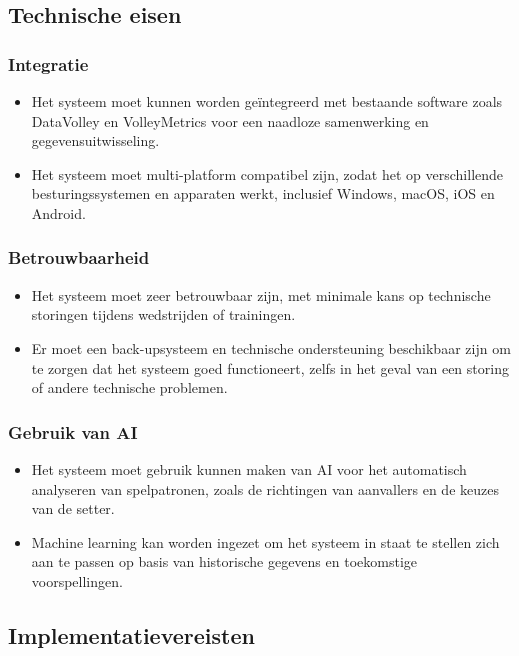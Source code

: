 \subsection{Technische eisen}
\subsubsection{Integratie}
\begin{itemize}
  \item Het systeem moet kunnen worden geïntegreerd met bestaande software zoals DataVolley en VolleyMetrics voor een naadloze samenwerking en gegevensuitwisseling.
  \item Het systeem moet multi-platform compatibel zijn, zodat het op verschillende besturingssystemen en apparaten werkt, inclusief Windows, macOS, iOS en Android.
\end{itemize}

\subsubsection{Betrouwbaarheid}
\begin{itemize}
  \item Het systeem moet zeer betrouwbaar zijn, met minimale kans op technische storingen tijdens wedstrijden of trainingen.
  \item Er moet een back-upsysteem en technische ondersteuning beschikbaar zijn om te zorgen dat het systeem goed functioneert, zelfs in het geval van een storing of andere technische problemen.
\end{itemize}

\subsubsection{Gebruik van AI}
\begin{itemize}
  \item Het systeem moet gebruik kunnen maken van AI voor het automatisch analyseren van spelpatronen, zoals de richtingen van aanvallers en de keuzes van de setter.
  \item Machine learning kan worden ingezet om het systeem in staat te stellen zich aan te passen op basis van historische gegevens en toekomstige voorspellingen.
\end{itemize}

\subsection{Implementatievereisten}
